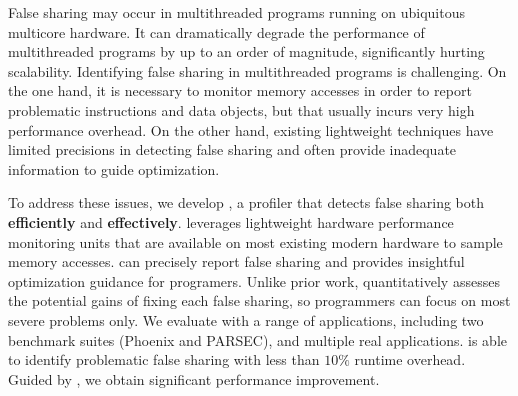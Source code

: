 
False sharing may occur in multithreaded programs running on ubiquitous multicore hardware. It can dramatically degrade the performance of multithreaded programs by up to an order of magnitude, significantly hurting scalability. Identifying false sharing in multithreaded programs is challenging. On the one hand, it is necessary to monitor memory accesses in order to report problematic instructions and data objects, 
but that usually incurs very high performance overhead. On the other hand, existing lightweight techniques have limited precisions in detecting false sharing and often provide inadequate information to guide optimization.

\sloppy
To address these issues, we develop \cheetah{}, a profiler that detects false sharing both {\bf efficiently} and {\bf effectively}. \cheetah{} leverages lightweight hardware performance monitoring units that are available on most existing modern hardware to sample memory accesses.  \cheetah{} can precisely report false sharing and provides insightful optimization guidance for programers. Unlike prior work, \cheetah{} quantitatively assesses the potential gains of fixing each false sharing, so programmers can focus on most severe problems only. %
We evaluate \cheetah{} with a range of applications, including two benchmark suites (Phoenix and PARSEC), and multiple real applications. \Cheetah{} is able to identify problematic false sharing with less than  $10\%$ runtime overhead. Guided by \Cheetah{}, we obtain significant performance improvement.

